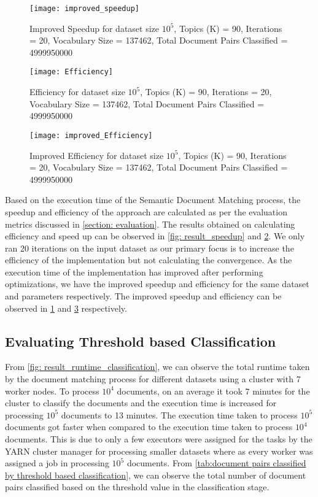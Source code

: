 \begin{figure}[htbp]
	\centering
		\texttt{[image: improved\_speedup]}
	\caption{Improved Speedup for dataset size \(10^5\), Topics (K) = 90, Iterations = 20, Vocabulary Size = 137462, Total Document Pairs Classified =  4999950000}
	\label{fig: result_improved_speedup}
\end{figure}

\begin{figure}[htbp]
	\centering
		\texttt{[image: Efficiency]}
	\caption{Efficiency for dataset size \(10^5\), Topics (K) = 90, Iterations = 20, Vocabulary Size = 137462, Total Document Pairs Classified =  4999950000}
	\label{fig: result_efficiency}
\end{figure}

\begin{figure}[htbp]
	\centering
		\texttt{[image: improved\_Efficiency]}
	\caption{Improved Efficiency for dataset size \(10^5\), Topics (K) = 90, Iterations = 20, Vocabulary Size = 137462, Total Document Pairs Classified =  4999950000}
	\label{fig: result_improved_efficiency}
\end{figure}


\par Based on the execution time of the Semantic Document Matching process, the speedup and efficiency of the approach are calculated as per the evaluation metrics discussed in \ref{section: evaluation}. The results obtained on calculating efficiency and speed up can be observed in \ref{fig: result_speedup} and \ref{fig: result_efficiency}. We only ran 20 iterations on the input dataset as our primary focus is to increase the efficiency of the implementation but not calculating the convergence. As the execution time of the implementation has improved after performing optimizations, we have the improved speedup and efficiency for the same dataset and parameters respectively. The improved speedup and efficiency can be observed in \ref{fig: result_improved_speedup} and \ref{fig: result_improved_efficiency} respectively.

\subsection{Evaluating Threshold based Classification}
\label{subsection: evaluating threshold}

From \ref{fig: result_runtime_classification}, we can observe the total runtime taken by the document matching process for different datasets using a cluster with 7 worker nodes. To process \(10^4\) documents, on an average it took 7 minutes for the cluster to classify the documents and the execution time is increased for processing \(10^5\) documents to 13 minutes. The execution time taken to process \(10^5\) documents got faster when compared to the execution time taken to process \(10^4\) documents. This is due to only a few executors were assigned for the tasks by the YARN cluster manager for processing smaller datasets where as every worker was assigned a job in processing \(10^5\) documents. From \ref{tab:document pairs classified by threshold based classification}, we can observe the total number of document pairs classified based on the threshold value in the classification stage.

